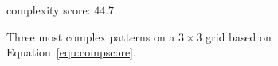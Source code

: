 \begin{figure}[!t]
{\begin{minipage}[b]{0.12\textwidth}
                \centering  complexity score: $44.7$
                \end{minipage}
            }
            \vspace{-2mm}
            \caption{Three most complex patterns on a $3\times 3$ grid based on Equation~\ref{equ:compscore}.}
            \vspace{-2mm}
            \label{fig:most complex patterns}
        \end{figure}

